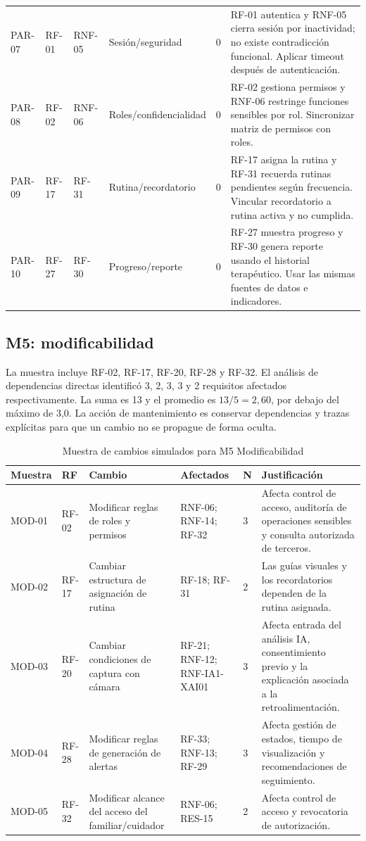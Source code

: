 \documentclass[12pt,a4paper]{article}
\begin{document}
\begin{longtable}{p{}p{}p{}p{}p{}p{}}
PAR-07 & RF-01 & RNF-05 & Sesión/seguridad & 0 & RF-01 autentica y RNF-05 cierra sesión por inactividad; no existe contradicción funcional. Aplicar timeout después de autenticación. \\
PAR-08 & RF-02 & RNF-06 & Roles/confidencialidad & 0 & RF-02 gestiona permisos y RNF-06 restringe funciones sensibles por rol. Sincronizar matriz de permisos con roles. \\
PAR-09 & RF-17 & RF-31 & Rutina/recordatorio & 0 & RF-17 asigna la rutina y RF-31 recuerda rutinas pendientes según frecuencia. Vincular recordatorio a rutina activa y no cumplida. \\
PAR-10 & RF-27 & RF-30 & Progreso/reporte & 0 & RF-27 muestra progreso y RF-30 genera reporte usando el historial terapéutico. Usar las mismas fuentes de datos e indicadores. \\
\bottomrule\end{longtable}\normalsize

\subsection{M5: modificabilidad}
La muestra incluye RF-02, RF-17, RF-20, RF-28 y RF-32. El análisis de dependencias directas identificó 3, 2, 3, 3 y 2 requisitos afectados respectivamente. La suma es 13 y el promedio es $13/5 = 2,60$, por debajo del máximo de 3,0. La acción de mantenimiento es conservar dependencias y trazas explícitas para que un cambio no se propague de forma oculta.

\begin{table}[H]\centering\caption{Muestra de cambios simulados para M5 Modificabilidad}
\small
\begin{tabularx}{\textwidth}{p{}p{}p{}p{}p{}X}
\toprule
\textbf{Muestra}&\textbf{RF}&\textbf{Cambio}&\textbf{Afectados}&\textbf{N}&\textbf{Justificación}\\\midrule
MOD-01 & RF-02 & Modificar reglas de roles y permisos & RNF-06; RNF-14; RF-32 & 3 & Afecta control de acceso, auditoría de operaciones sensibles y consulta autorizada de terceros. \\
MOD-02 & RF-17 & Cambiar estructura de asignación de rutina & RF-18; RF-31 & 2 & Las guías visuales y los recordatorios dependen de la rutina asignada. \\
MOD-03 & RF-20 & Cambiar condiciones de captura con cámara & RF-21; RNF-12; RNF-IA1-XAI01 & 3 & Afecta entrada del análisis IA, consentimiento previo y la explicación asociada a la retroalimentación. \\
MOD-04 & RF-28 & Modificar reglas de generación de alertas & RF-33; RNF-13; RF-29 & 3 & Afecta gestión de estados, tiempo de visualización y recomendaciones de seguimiento. \\
MOD-05 & RF-32 & Modificar alcance del acceso del familiar/cuidador & RNF-06; RES-15 & 2 & Afecta control de acceso y revocatoria de autorización. \\
\bottomrule
\end{tabularx}
\normalsize
\end{table}
\end{document}
